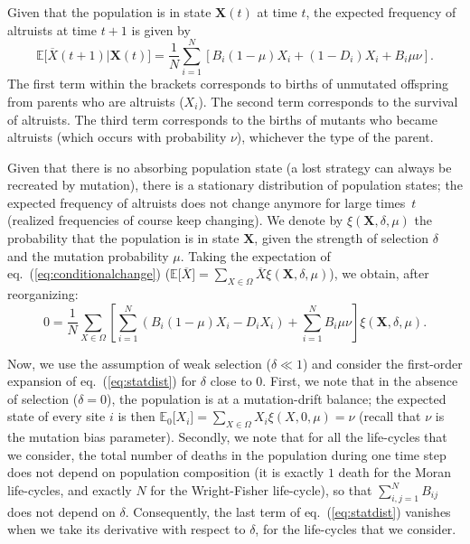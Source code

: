 \documentclass[11pt, letterpaper]{article}
\renewcommand{\eqref}[1]{\textup{{\normalfont eq.~(\ref{#1}}\normalfont)}}
\newcommand{\Esp}[1]{\mathbb{E}\big[ #1\big]}%
\newcommand{\Espzero}[1]{\mathbb{E}_0\big[ #1\big]}%
\newcommand{\mutbias}{\nu}
\newcommand{\selstr}{\delta}
\begin{document}
Given that the population is in state $\mathbf{X}(t)$ at time $t$, the expected frequency of altruists at time $t+1$ is given by
\begin{subequations}
\begin{equation}\label{eq:conditionalchange}
\Esp{\overline{X}(t+1) | \mathbf{X}(t)} = %
\frac{1}{N} \sum_{i=1}^N \left[ B_i (1-\mu) X_i + (1-D_i) X_i + B_i \mu \mutbias  \right]. 
\end{equation}
\end{subequations}
The first term within the brackets corresponds to births of unmutated offspring from parents who are altruists ($X_i$). The second term corresponds to the survival of altruists. The third term corresponds to the births of mutants who became altruists (which occurs with probability $\nu$), whichever the type of the parent. 

Given that there is no absorbing population state (a lost strategy can always be recreated by mutation), there is a stationary distribution of population states; the expected frequency of altruists does not change anymore for large times~$t$ (realized frequencies of course keep changing). We denote by $\xi(\mathbf{X}, \selstr, \mu)$ the probability that the population is in state $\mathbf{X}$, given the strength of selection $\selstr$ and the mutation probability $\mu$. Taking the expectation of \eqref{eq:conditionalchange} ($\Esp{\overline{X}} = \sum_{X \in \Omega} \overline{X}\xi(\mathbf{X}, \selstr, \mu)$), we obtain, after reorganizing:
\begin{equation}\label{eq:statdist}
0 = \frac{1}{N} \sum_{X\in \Omega} \left[ \sum_{i=1}^N \left( B_i (1-\mu) X_i - D_i X_i \right) + \sum_{i=1}^N B_i \mu \mutbias \right] \xi(\mathbf{X}, \selstr, \mu). 
\end{equation}

Now, we use the assumption of weak selection ($\selstr \ll 1$) and consider the first-order expansion of \eqref{eq:statdist} for $\selstr$ close to $0$. First, we note that in the absence of selection ($\selstr = 0$), the population is at a mutation-drift balance; the expected state of every site $i$ is then $\Espzero{X_i} = \sum_{X\in \Omega} X_i \xi(X, 0, \mu)= \mutbias$ (recall that $\mutbias$ is the mutation bias parameter). Secondly, we note that for all the life-cycles that we consider, the total number of deaths in the population during one time step does not depend on population composition (it is exactly $1$ death for the Moran life-cycles, and exactly $N$ for the Wright-Fisher life-cycle), so that $\sum_{i,j=1}^N B_{ij}$ does not depend on $\selstr$. Consequently, the last term of \eqref{eq:statdist} vanishes when we take its derivative with respect to $\selstr$, for the life-cycles that we consider.  
\end{document}
